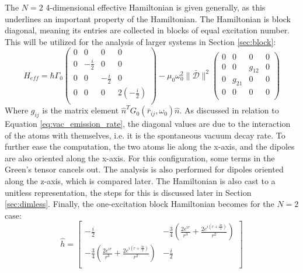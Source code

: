 \documentclass{article}
\begin{document}
The $N=2$ 4-dimensional effective Hamiltonian is given generally, as this underlines an important property of the Hamiltonian. The Hamiltonian is block diagonal, meaning its entries are collected in blocks of equal excitation number. This will be utilized for the analysis of larger systems in Section \ref{sec:block}:
\begin{equation}\label{eq:N2_general}
    \hat{H}_{eff} = \hbar \Gamma_0
    \begin{pmatrix}
        0 & 0 & 0 & 0 \\
        0 & - \frac{i}{2} & 0 & 0 \\
        0 & 0 & - \frac{i}{2} & 0 \\
        0 & 0 & 0 & 2 \left( - \frac{i}{2} \right) \\
    \end{pmatrix}
    - \mu_0 \omega_0^2 \| \bar{\mathscr{D}} \|^2
    \begin{pmatrix}
        0 & 0 & 0 & 0 \\
        0 & 0 & g_{12} & 0 \\
        0 & g_{21} & 0 & 0 \\
        0 & 0 & 0 & 0 \\
    \end{pmatrix}
\end{equation}
Where $g_{ij}$ is the matrix element $\hat{n}^T G_0(\bar{r}_{ij},\omega_0) \hat{n}$. As discussed in relation to Equation \ref{eq:vac_emission_rate}, the diagonal values are due to the interaction of the atoms with themselves, i.e. it is the spontaneous vacuum decay rate. To further ease the computation, the two atoms lie along the x-axis, and the dipoles are also oriented along the x-axis. For this configuration, some terms in the Green's tensor cancels out. The analysis is also performed for dipoles oriented along the z-axis, which is compared later. The Hamiltonian is also cast to a unitless representation, the steps for this is discussed later in Section \ref{sec:dimless}. Finally, the one-excitation block Hamiltonian becomes for the $N=2$ case:
\begin{equation}\label{eq:N2_Ham_block}
    \hat{h} = 
    \begin{bmatrix} 
        - \frac{i}{2} & -\frac{3}{4}\left( \frac{2e^{ir}}{r^3} + \frac{2e^{i(r+\frac{3\pi}{2})}}{r^2} \right) \\ 
        -\frac{3}{4}\left( \frac{2e^{ir}}{r^3} + \frac{2e^{i(r+\frac{3\pi}{2})}}{r^2} \right) & - \frac{i}{2} \\
    \end{bmatrix}
\end{equation}
\end{document}
